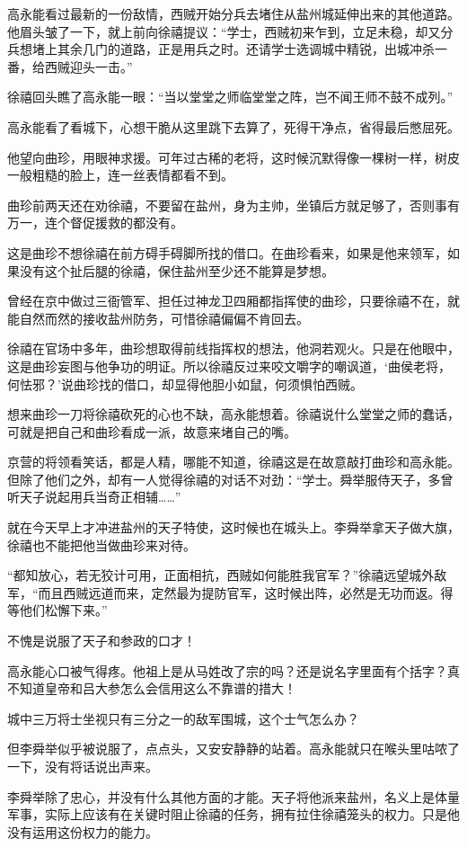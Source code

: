 高永能看过最新的一份敌情，西贼开始分兵去堵住从盐州城延伸出来的其他道路。他眉头皱了一下，就上前向徐禧提议：“学士，西贼初来乍到，立足未稳，却又分兵想堵上其余几门的道路，正是用兵之时。还请学士选调城中精锐，出城冲杀一番，给西贼迎头一击。”

徐禧回头瞧了高永能一眼：“当以堂堂之师临堂堂之阵，岂不闻王师不鼓不成列。”

高永能看了看城下，心想干脆从这里跳下去算了，死得干净点，省得最后憋屈死。

他望向曲珍，用眼神求援。可年过古稀的老将，这时候沉默得像一棵树一样，树皮一般粗糙的脸上，连一丝表情都看不到。

曲珍前两天还在劝徐禧，不要留在盐州，身为主帅，坐镇后方就足够了，否则事有万一，连个督促援救的都没有。

这是曲珍不想徐禧在前方碍手碍脚所找的借口。在曲珍看来，如果是他来领军，如果没有这个扯后腿的徐禧，保住盐州至少还不能算是梦想。

曾经在京中做过三衙管军、担任过神龙卫四厢都指挥使的曲珍，只要徐禧不在，就能自然而然的接收盐州防务，可惜徐禧偏偏不肯回去。

徐禧在官场中多年，曲珍想取得前线指挥权的想法，他洞若观火。只是在他眼中，这是曲珍妄图与他争功的明证。所以徐禧反过来咬文嚼字的嘲讽道，‘曲侯老将，何怯邪？’说曲珍找的借口，却显得他胆小如鼠，何须惧怕西贼。

想来曲珍一刀将徐禧砍死的心也不缺，高永能想着。徐禧说什么堂堂之师的蠢话，可就是把自己和曲珍看成一派，故意来堵自己的嘴。

京营的将领看笑话，都是人精，哪能不知道，徐禧这是在故意敲打曲珍和高永能。但除了他们之外，却有一人觉得徐禧的对话不对劲：“学士。舜举服侍天子，多曾听天子说起用兵当奇正相辅……”

就在今天早上才冲进盐州的天子特使，这时候也在城头上。李舜举拿天子做大旗，徐禧也不能把他当做曲珍来对待。

“都知放心，若无狡计可用，正面相抗，西贼如何能胜我官军？”徐禧远望城外敌军，“而且西贼远道而来，定然最为提防官军，这时候出阵，必然是无功而返。得等他们松懈下来。”

不愧是说服了天子和参政的口才！

高永能心口被气得疼。他祖上是从马姓改了宗的吗？还是说名字里面有个括字？真不知道皇帝和吕大参怎么会信用这么不靠谱的措大！

城中三万将士坐视只有三分之一的敌军围城，这个士气怎么办？

但李舜举似乎被说服了，点点头，又安安静静的站着。高永能就只在喉头里咕哝了一下，没有将话说出声来。

李舜举除了忠心，并没有什么其他方面的才能。天子将他派来盐州，名义上是体量军事，实际上应该有在关键时阻止徐禧的任务，拥有拉住徐禧笼头的权力。只是他没有运用这份权力的能力。

